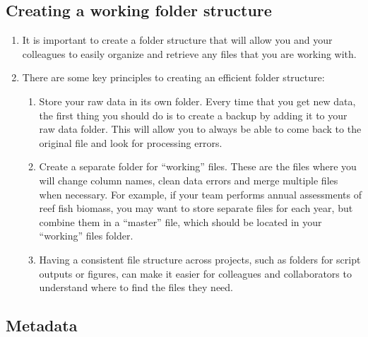 \documentclass[
]{book}
\providecommand{\tightlist}{%
  \setlength{\itemsep}{0pt}\setlength{\parskip}{0pt}}
\begin{document}
\hypertarget{creating-a-working-folder-structure}{%
\subsection{Creating a working folder structure}\label{creating-a-working-folder-structure}}

\begin{enumerate}
\def\labelenumi{\arabic{enumi}.}
\item
  It is important to create a folder structure that will allow you and your colleagues to easily organize and retrieve any files that you are working with.
\item
  There are some key principles to creating an efficient folder structure:

  \begin{enumerate}
  \def\labelenumii{\arabic{enumii}.}
  \tightlist
  \item
    Store your raw data in its own folder. Every time that you get new data, the first thing you should do is to create a backup by adding it to your raw data folder. This will allow you to always be able to come back to the original file and look for processing errors.
  \item
    Create a separate folder for ``working'' files. These are the files where you will change column names, clean data errors and merge multiple files when necessary. For example, if your team performs annual assessments of reef fish biomass, you may want to store separate files for each year, but combine them in a ``master'' file, which should be located in your ``working'' files folder.
  \item
    Having a consistent file structure across projects, such as folders for script outputs or figures, can make it easier for colleagues and collaborators to understand where to find the files they need.
  \end{enumerate}
\end{enumerate}

\hypertarget{metadata}{%
\subsection{Metadata}\label{metadata}}
\end{document}
